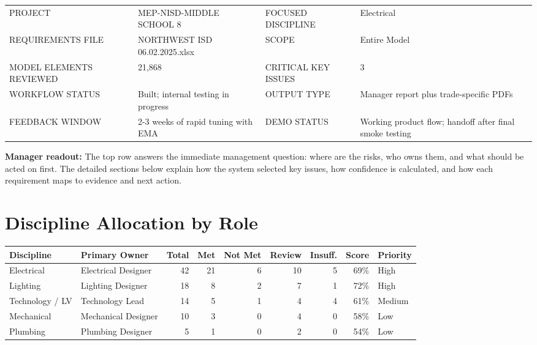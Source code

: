\documentclass[10pt,letterpaper]{article}
\newcommand{\strong}[1]{\textbf{\textcolor{emaNavy}{#1}}}
\newcommand{\smalllabel}[1]{{\scriptsize\textcolor{emaMuted}{\MakeUppercase{#1}}}}
\begin{document}
\vspace{4pt}
\begin{tcolorbox}[colback=emaSoft]
\begin{tabularx}{\textwidth}{p{1.45in}X p{1.45in}X}
\smalllabel{Project} & MEP-NISD-MIDDLE SCHOOL 8 & \smalllabel{Focused Discipline} & Electrical \\
\smalllabel{Requirements File} & NORTHWEST ISD 06.02.2025.xlsx & \smalllabel{Scope} & Entire Model \\
\smalllabel{Model Elements Reviewed} & 21,868 & \smalllabel{Critical Key Issues} & 3 \\
\smalllabel{Workflow Status} & Built; internal testing in progress & \smalllabel{Output Type} & Manager report plus trade-specific PDFs \\
\smalllabel{Feedback Window} & 2-3 weeks of rapid tuning with EMA & \smalllabel{Demo Status} & Working product flow; handoff after final smoke testing \\
\end{tabularx}
\end{tcolorbox}

\begin{tcolorbox}[colback=white,borderline west={3pt}{0pt}{emaBlue}]
\strong{Manager readout:} The top row answers the immediate management question: where are the risks, who owns them, and what should be acted on first. The detailed sections below explain how the system selected key issues, how confidence is calculated, and how each requirement maps to evidence and next action.
\end{tcolorbox}

\section*{Discipline Allocation by Role}

\begin{tcolorbox}
\begin{tabularx}{\textwidth}{p{1.35in}p{1.28in}rrrrrrp{1.0in}}
\toprule
\textbf{Discipline} & \textbf{Primary Owner} & \textbf{Total} & \textbf{Met} & \textbf{Not Met} & \textbf{Review} & \textbf{Insuff.} & \textbf{Score} & \textbf{Priority} \\
\midrule
Electrical & Electrical Designer & 42 & 21 & 6 & 10 & 5 & 69\% & High \\
Lighting & Lighting Designer & 18 & 8 & 2 & 7 & 1 & 72\% & High \\
Technology / LV & Technology Lead & 14 & 5 & 1 & 4 & 4 & 61\% & Medium \\
Mechanical & Mechanical Designer & 10 & 3 & 0 & 4 & 0 & 58\% & Low \\
Plumbing & Plumbing Designer & 5 & 1 & 0 & 2 & 0 & 54\% & Low \\
\bottomrule
\end{tabularx}
\end{tcolorbox}
\end{document}
